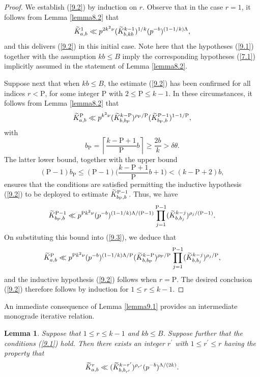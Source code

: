 \documentclass[12pt,reqno]{amsart}
\newtheorem{lemma}[theorem]{Lemma}
\theoremstyle{definition}
\theoremstyle{remark}
\numberwithin{equation}{section}
\def\del{{\delta}} \def\Del{{\Delta}} \def\Deltil{{\widetilde \Delta}}
\def\tet{{\theta}} \def\bftet{{\boldsymbol \theta}}
\def\Rho{{\mathrm P}}\def\bfrho{{\boldsymbol \rho}}
\def\le{\leqslant} \def\ge{\geqslant} \def\pleq{\preccurlyeq} \def\ple{\prec}
\begin{document}
\begin{proof} We establish (\ref{9.2}) by induction on $r$. Observe that in the case 
$r=1$, it follows from Lemma \ref{lemma8.2} that
$$\widetilde K_{a,b}^1\ll p^{2k^2\nu}(\widetilde K_{b,kb}^{k-1})^{1/k}(p^{-b})^{(1-1/k){\Lambda}},$$
and this delivers (\ref{9.2}) in this initial case. Note here that the hypotheses (\ref{9.1}) 
together with the assumption $kb\le B$ imply the corresponding hypotheses (\ref{7.1}) 
implicitly assumed in the statement of Lemma \ref{lemma8.2}.\par

Suppose next that when $kb\le B$, the estimate (\ref{9.2}) has been confirmed for all 
indices $r<\Rho$, for some integer $\Rho$ with $2\le \Rho\le k-1$. In these circumstances, 
it follows from Lemma \ref{lemma8.2} that
\begin{equation}\label{9.3}
\Ktil_{a,b}^\Rho\ll p^{k^2\nu}(\Ktil_{b,b_\Rho}^{k-\Rho})^{\rho_\Rho/\Rho}
(\Ktil_{b_\Rho,b}^{\Rho-1})^{1-1/\Rho},
\end{equation}
with
$$b_\Rho=\left\lceil \frac{k-\Rho+1}{\Rho}b\right\rceil \ge \frac{2b}{k}>\del \tet .$$
The latter lower bound, together with the upper bound
$$(\Rho-1)b_\Rho \le (\Rho-1)\biggl( \frac{k-\Rho+1}{\Rho}b+1\biggr) 
<(k-\Rho+2)b,$$
ensures that the conditions are satisfied permitting the inductive hypothesis (\ref{9.2}) to 
be deployed to estimate $\Ktil_{b_\Rho,b}^{\Rho-1}$. Thus, we have
$$\Ktil_{b_\Rho,b}^{\Rho-1}\ll p^{\Rho k^2\nu}
(p^{-b})^{(1-1/k)\Lam/(\Rho-1)}\prod_{j=1}^{\Rho-1} 
(\Ktil_{b,b_j}^{k-j})^{\rho_j/(\Rho-1)}.$$
On substituting this bound into (\ref{9.3}), we deduce that
$$\Ktil_{a,b}^\Rho \ll p^{\Rho k^2\nu}(p^{-b})^{(1-1/k)\Lam/\Rho}
(\Ktil_{b,b_\Rho}^{k-\Rho})^{\rho_\Rho/\Rho}\prod_{j=1}^{\Rho-1} 
(\Ktil_{b,b_j}^{k-j})^{\rho_j/\Rho},$$
and the inductive hypothesis (\ref{9.2}) follows when $r=\Rho$. The desired conclusion 
(\ref{9.2}) therefore follows by induction for $1\le r\le k-1$.
\end{proof}

An immediate consequence of Lemma \ref{lemma9.1} provides an intermediate 
monograde iterative relation.

\begin{lemma}\label{lemma9.2} Suppose that $1\le r\le k-1$ and $kb\le B$. Suppose further 
that the conditions (\ref{9.1}) hold. Then there 
exists an integer $r^\prime$ with $1\le r^\prime \le r$ having the property that
$$\widetilde K_{a,b}^r\ll (\widetilde K_{b,b_{r^\prime}}^{k-r^\prime})^{\rho_{r^\prime}}
(p^{-b})^{{\Lambda}/(2k)}.$$
\end{lemma}
\end{document}
